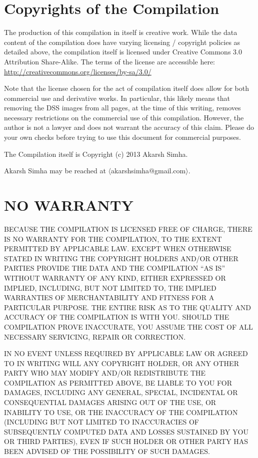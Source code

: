 \section{Copyrights of the Compilation}

The production of this compilation in itself is creative work. While
the data content of the compilation does have varying licensing /
copyright policies as detailed above, the compilation itself is
licensed under Creative Commons 3.0 Attribution Share-Alike. The terms
of the license are accessible here:
\url{http://creativecommons.org/licenses/by-sa/3.0/}

Note that the license chosen for the act of compilation itself does
allow for both commercial use and derivative works. In particular,
this likely means that removing the DSS images from all pages, at the
time of this writing, removes necessary restrictions on the commercial
use of this compilation. However, the author is not a lawyer and does
not warrant the accuracy of this claim. Please do your own checks
before trying to use this document for commercial purposes.

The Compilation itself is Copyright (c) 2013 Akarsh Simha.

Akarsh Simha may be reached at $\langle$akarshsimha@gmail.com$\rangle$.

\section{NO WARRANTY}

  BECAUSE THE COMPILATION IS LICENSED FREE OF CHARGE, THERE IS NO
  WARRANTY FOR THE COMPILATION, TO THE EXTENT PERMITTED BY APPLICABLE
  LAW.  EXCEPT WHEN OTHERWISE STATED IN WRITING THE COPYRIGHT HOLDERS
  AND/OR OTHER PARTIES PROVIDE THE DATA AND THE COMPILATION ``AS IS''
  WITHOUT WARRANTY OF ANY KIND, EITHER EXPRESSED OR IMPLIED,
  INCLUDING, BUT NOT LIMITED TO, THE IMPLIED WARRANTIES OF
  MERCHANTABILITY AND FITNESS FOR A PARTICULAR PURPOSE.  THE ENTIRE
  RISK AS TO THE QUALITY AND ACCURACY OF THE COMPILATION IS WITH YOU.
  SHOULD THE COMPILATION PROVE INACCURATE, YOU ASSUME THE COST OF ALL
  NECESSARY SERVICING, REPAIR OR CORRECTION.

  IN NO EVENT UNLESS REQUIRED BY APPLICABLE LAW OR AGREED TO IN
  WRITING WILL ANY COPYRIGHT HOLDER, OR ANY OTHER PARTY WHO MAY MODIFY
  AND/OR REDISTRIBUTE THE COMPILATION AS PERMITTED ABOVE, BE LIABLE TO
  YOU FOR DAMAGES, INCLUDING ANY GENERAL, SPECIAL, INCIDENTAL OR
  CONSEQUENTIAL DAMAGES ARISING OUT OF THE USE, OR INABILITY TO USE,
  OR THE INACCURACY OF THE COMPILATION (INCLUDING BUT NOT LIMITED TO
  INACCURACIES OF SUBSEQUENTLY COMPUTED DATA AND LOSSES SUSTAINED BY
  YOU OR THIRD PARTIES), EVEN IF SUCH HOLDER OR OTHER PARTY HAS BEEN
  ADVISED OF THE POSSIBILITY OF SUCH DAMAGES.

